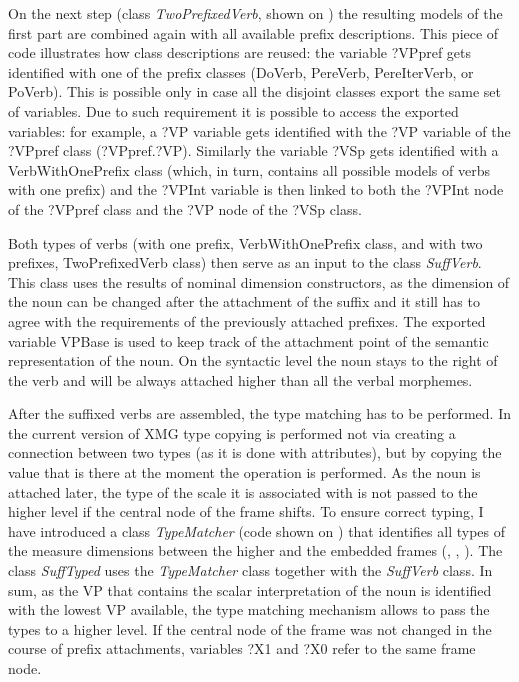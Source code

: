On the next step (class \textit{TwoPrefixedVerb}, shown on ) the resulting models of the first part are combined again with all available prefix descriptions. This piece of code illustrates how class descriptions are reused: the variable ?VPpref gets identified with one of the prefix classes (DoVerb, PereVerb, PereIterVerb, or PoVerb). This is possible only in case all the disjoint classes export the same set of variables. Due to such requirement it is possible to access the exported variables: for example, a ?VP variable gets identified with the ?VP variable of the ?VPpref class (?VPpref.?VP). Similarly the variable ?VSp gets identified with a VerbWithOnePrefix class (which, in turn, contains all possible models of verbs with one prefix) and the ?VPInt variable is then linked to both the ?VPInt node of the ?VPpref class and the ?VP node of the ?VSp class. 

Both types of verbs (with one prefix, VerbWithOnePrefix class, and with two prefixes, TwoPrefixedVerb class) then serve as an input to the class \textit{SuffVerb}. This class uses the results of nominal dimension constructors, as the dimension of the noun can be changed after the attachment of the suffix and it still has to agree with the requirements of the previously attached prefixes. The exported variable VPBase is used to keep track of the attachment point of the semantic representation of the noun. On the syntactic level the noun stays to the right of the verb and will be always attached higher than all the verbal morphemes. 

After the suffixed verbs are assembled, the type matching has to be performed. In the current version of XMG type copying is performed not via creating a connection between two types (as it is done with attributes), but by copying the value that is there at the moment the operation is performed. As the noun is attached later, the type of the scale it is associated with is not passed to the higher level if the central node of the frame shifts. To ensure correct typing, I have introduced a class \textit{TypeMatcher} (code shown on ) that identifies all types of the measure dimensions between the higher and the embedded frames (\MDIM, \NOUNDIM, \VERBDIM). The class \textit{SuffTyped} uses the \textit{TypeMatcher} class together with the \textit{SuffVerb} class. In sum, as the VP that contains the scalar interpretation of the noun is identified with the lowest VP available, the type matching mechanism allows to pass the types to a higher level. If the central node of the frame was not changed in the course of prefix attachments, variables ?X1 and ?X0 refer to the same frame node.

